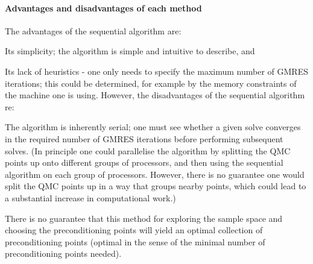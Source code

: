 \paragraph{Advantages and disadvantages of each method} The advantages of the sequential algorithm are:
\bit
\item Its simplicity; the algorithm is simple and intuitive to describe, and
\item Its lack of heuristics - one only needs to specify the maximum number of GMRES iterations; this could be determined, for example by the memory constraints of the machine one is using.
    \eit
    However, the disadvantages of the sequential algorithm re:
    \bit
  \item The algorithm is inherently serial; one must see whether a given solve converges in the required number of GMRES iterations before performing subsequent solves. (In principle one could parallelise the algorithm by splitting the QMC points up onto different groups of processors, and then using the sequential algorithm on each group of processors. However, there is no guarantee one would split the QMC points up in a way that groups nearby points, which could lead to a substantial increase in computational work.)
    \item There is no guarantee that this method for exploring the sample space and choosing the preconditioning points will yield an optimal collection of preconditioning points (optimal in the sense of the minimal number of preconditioning points needed).
    \eit

